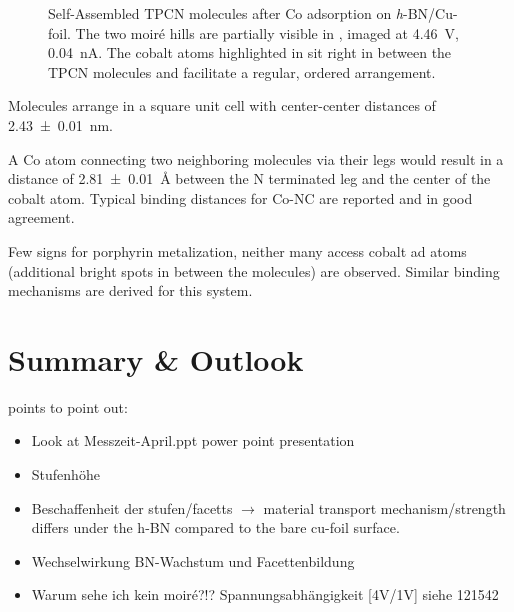 \begin{figure}[!h]
{	  	\label{fig:TPCN+Co-STM-small-model}
  	}
  	\caption{Self-Assembled TPCN molecules after Co adsorption on \textit{h}-BN/Cu-foil. The two moir\'e hills are partially visible in , imaged at \SI{4.46}{\volt}, \SI{0.04}{\nano\ampere}. The cobalt atoms highlighted in  sit right in between the TPCN molecules and facilitate a regular, ordered arrangement.}
  	\label{fig:TPCN+Co-STM}
  \end{figure}
  
Molecules arrange in a square unit cell with center-center distances of \SI{2.43 \pm 0.01}{\nano \meter}.
  
A Co atom connecting two neighboring molecules via their legs would result in a distance of \SI{2.81 \pm 0.01}{\angstrom} between the N terminated leg and the center of the cobalt atom. Typical binding distances for Co-NC are reported \cite{schlickum_metalorganic_2007, przychodzen_supramolecular_2006} and in good agreement.

Few signs for porphyrin metalization, neither many access cobalt ad atoms (additional bright spots in between the molecules) are observed. Similar binding mechanisms are derived for this system.\cite{urgel_controlling_2015}

  
  
  
  \section{Summary \& Outlook}
  points to point out:
  \begin{itemize}
  	\item Look at Messzeit-April.ppt power point presentation
  	\item Stufenh\"ohe
  	\item Beschaffenheit der stufen/facetts $\rightarrow$ material transport mechanism/strength differs under the h-BN compared to the bare cu-foil surface.
  	\item Wechselwirkung BN-Wachstum und Facettenbildung
  	\item Warum sehe ich kein moir\'e?!? Spannungsabhängigkeit [4V/1V] siehe 121542
  \end{itemize}

